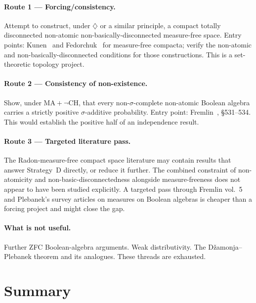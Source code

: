 \documentclass[11pt]{article}
\theoremstyle{definition}
\theoremstyle{remark}
\begin{document}
\paragraph{Route 1 --- Forcing/consistency.}
Attempt to construct, under $\diamondsuit$ or a similar principle, a compact totally
disconnected non-atomic non-basically-disconnected measure-free space. Entry points:
Kunen~\cite{Kunen1981} and Fedorchuk~\cite{Fedorchuk1976} for measure-free compacta;
verify the non-atomic and non-basically-disconnected conditions for those
constructions. This is a set-theoretic topology project.

\paragraph{Route 2 --- Consistency of non-existence.}
Show, under $\mathrm{MA}+\neg\mathrm{CH}$, that every non-$\sigma$-complete
non-atomic Boolean algebra carries a strictly positive $\sigma$-additive probability.
Entry point: Fremlin~\cite{Fremlin2004}, \S531--534. This would establish the
positive half of an independence result.

\paragraph{Route 3 --- Targeted literature pass.}
The Radon-measure-free compact space literature may contain results that answer
Strategy~D directly, or reduce it further. The combined constraint of non-atomicity
and non-basic-disconnectedness alongside measure-freeness does not appear to have
been studied explicitly. A targeted pass through Fremlin vol.~5 and Plebanek's survey
articles on measures on Boolean algebras is cheaper than a forcing project and might
close the gap.

\paragraph{What is not useful.}
Further ZFC Boolean-algebra arguments. Weak distributivity. The
Dža\-monja--Plebanek theorem and its analogues. These threads are exhausted.

\section{Summary}
\end{document}
